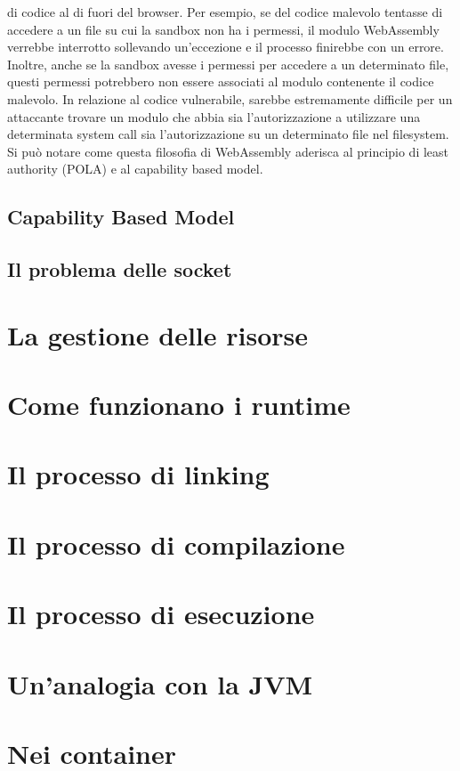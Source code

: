 di codice al di fuori del browser. Per esempio, se del codice malevolo tentasse di accedere a un file su cui la sandbox
non ha i permessi, il modulo WebAssembly verrebbe interrotto sollevando un'eccezione e il processo finirebbe con un
errore. Inoltre, anche se la sandbox avesse i permessi per accedere a un determinato file, questi permessi potrebbero
non essere associati al modulo contenente il codice malevolo. In relazione al codice vulnerabile, sarebbe estremamente
difficile per un attaccante trovare un modulo che abbia sia l'autorizzazione a utilizzare una determinata system call
sia l'autorizzazione su un determinato file nel filesystem. \\ Si può notare come questa filosofia di WebAssembly
aderisca al principio di least authority (POLA) e al capability based model.
\subsection{Capability Based Model}
\subsection{Il problema delle socket}
\section{La gestione delle risorse}

\section{Come funzionano i runtime}
\section{Il processo di linking}
\section{Il processo di compilazione}
\section{Il processo di esecuzione}
\section{Un'analogia con la JVM}
\section{Nei container}